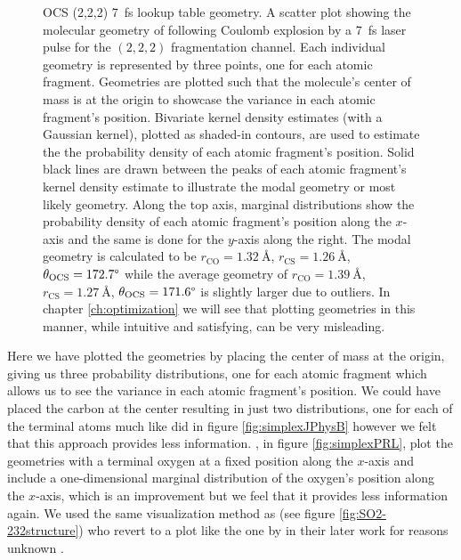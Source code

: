 \begin{figure}
  {OCS (2,2,2) \SI{7}{\fs} lookup table geometry. A scatter plot showing the molecular geometry of  following Coulomb explosion by a \SI{7}{\fs} laser pulse for the $(2,2,2)$ fragmentation channel. Each individual geometry is represented by three points, one for each atomic fragment. Geometries are plotted such that the molecule's center of mass is at the origin to showcase the variance in each atomic fragment's position. Bivariate kernel density estimates (with a Gaussian kernel), plotted as shaded-in contours, are used to estimate the the probability density of each atomic fragment's position. Solid black lines are drawn between the peaks of each atomic fragment's kernel density estimate to illustrate the modal geometry or most likely geometry. Along the top axis, marginal distributions show the probability density of each  atomic fragment's position along the $x$-axis and the same is done for the $y$-axis along the right. The modal geometry is calculated to be $r_\mathrm{CO} = \SI{1.32}{\angstrom}$, $r_\mathrm{CS} = \SI{1.26}{\angstrom}$, $ \theta_\mathrm{OCS} = 172.7\degree$ while the average geometry of $r_\mathrm{CO} = \SI{1.39}{\angstrom}$, $r_\mathrm{CS} = \SI{1.27}{\angstrom}$, $ \theta_\mathrm{OCS} = 171.6\degree$ is slightly larger due to outliers. In chapter \ref{ch:optimization} we will see that plotting geometries in this manner, while intuitive and satisfying, can be very misleading.}
  \label{fig:OCS2227fsLTGeometry}
\end{figure}

Here we have plotted the geometries by placing the center of mass at the origin, giving us three probability distributions, one for each atomic fragment which allows us to see the variance in each atomic fragment's position. We could have placed the carbon at the center resulting in just two distributions, one for each of the terminal atoms much like \citet{Brichta07} did in figure \ref{fig:simplexJPhysB} however we felt that this approach provides less information. \cite{Bocharova11}, in figure \ref{fig:simplexPRL}, plot the geometries with a terminal oxygen at a fixed position along the $x$-axis and include a one-dimensional marginal distribution of the oxygen's position along the $x$-axis, which is an improvement but we feel that it provides less information again.  We used the same visualization method as \citet{Legare05structure} (see figure \ref{fig:SO2-232structure}) who revert to a plot like the one by \citet{Bocharova11} in their later work for reasons unknown \citep{Legare05dynamics}.

